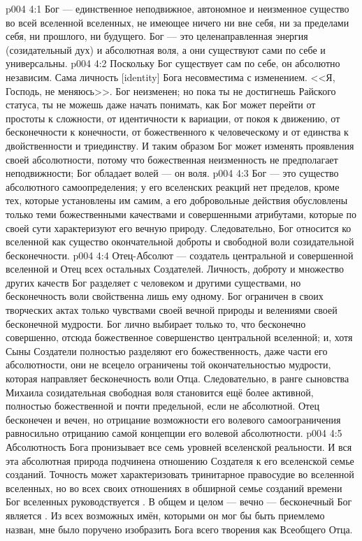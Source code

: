 \vs p004 4:1 Бог --- единственное неподвижное, автономное и неизменное существо во всей вселенной вселенных, не имеющее ничего ни вне себя, ни за пределами себя, ни прошлого, ни будущего. Бог --- это целенаправленная энергия (созидательный дух) и абсолютная воля, а они существуют сами по себе и универсальны.
\vs p004 4:2 Поскольку Бог существует сам по себе, он абсолютно независим. Сама личность [identity] Бога несовместима с изменением. <<Я, Господь, не меняюсь>>. Бог неизменен; но пока ты не достигнешь Райского статуса, ты не можешь даже начать понимать, как Бог может перейти от простоты к сложности, от идентичности к вариации, от покоя к движению, от бесконечности к конечности, от божественного к человеческому и от единства к двойственности и триединству. И таким образом Бог может изменять проявления своей абсолютности, потому что божественная неизменность не предполагает неподвижности; Бог обладает волей --- он  воля.
\vs p004 4:3 Бог --- это существо абсолютного самоопределения; у его вселенских реакций нет пределов, кроме тех, которые установлены им самим, а его добровольные действия обусловлены только теми божественными качествами и совершенными атрибутами, которые по своей сути характеризуют его вечную природу. Следовательно, Бог относится ко вселенной как существо окончательной доброты и свободной воли созидательной бесконечности.
\vs p004 4:4 Отец\hyp{}Абсолют --- создатель центральной и совершенной вселенной и Отец всех остальных Создателей. Личность, доброту и множество других качеств Бог разделяет с человеком и другими существами, но бесконечность воли свойственна лишь ему одному. Бог ограничен в своих творческих актах только чувствами своей вечной природы и велениями своей бесконечной мудрости. Бог лично выбирает только то, что бесконечно совершенно, отсюда божественное совершенство центральной вселенной; и, хотя Сыны Создатели полностью разделяют его божественность, даже части его абсолютности, они не всецело ограничены той окончательностью мудрости, которая направляет бесконечность воли Отца. Следовательно, в ранге сыновства Михаила созидательная свободная воля становится ещё более активной, полностью божественной и почти предельной, если не абсолютной. Отец бесконечен и вечен, но отрицание возможности его волевого самоограничения равносильно отрицанию самой концепции его волевой абсолютности.
\vs p004 4:5 \pc Абсолютность Бога пронизывает все семь уровней вселенской реальности. И вся эта абсолютная природа подчинена отношению Создателя к его вселенской семье созданий. Точность может характеризовать тринитарное правосудие во вселенной вселенных, но во всех своих отношениях в обширной семье созданий времени Бог вселенных руководствуется . В общем и целом --- вечно --- бесконечный Бог является . Из всех возможных имён, которыми он мог бы быть приемлемо назван, мне было поручено изобразить Бога всего творения как Всеобщего Отца.
